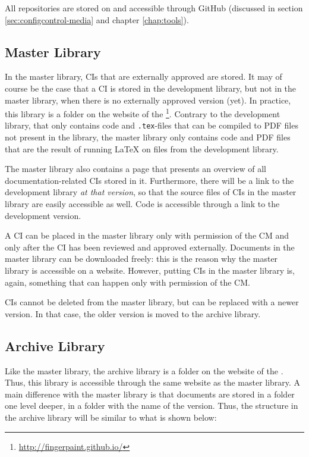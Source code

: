 All repositories are stored on and accessible through GitHub (discussed in section \ref{sec:configcontrol-media} and chapter \ref{chap:tools}).

\subsection{Master Library}
In the master library, CIs that are externally approved are stored. It may of course be the case that a CI is stored in the development library, but not in the master library, when there is no externally approved version (yet). In practice, this library is a folder on the website of the \applicationname{}\footnote{\url{http://fingerpaint.github.io/}}. Contrary to the development library, that only contains code and \texttt{.tex}-files that can be compiled to PDF files not present in the library, the master library only contains code and PDF files that are the result of running \LaTeX{} on files from the development library.

The master library also contains a page that presents an overview of all documentation-related CIs stored in it. Furthermore, there will be a link to the development library \emph{at that version}, so that the source files of CIs in the master library are easily accessible as well. Code is accessible through a link to the development version.

A CI can be placed in the master library only with permission of the CM and only after the CI has been reviewed and approved externally. Documents in the master library can be downloaded freely: this is the reason why the master library is accessible on a website. However, putting CIs in the master library is, again, something that can happen only with permission of the CM.

CIs cannot be deleted from the master library, but can be replaced with a newer version. In that case, the older version is moved to the archive library.

\subsection{Archive Library}
Like the master library, the archive library is a folder on the website of the \applicationname{}. Thus, this library is accessible through the same website as the master library. A main difference with the master library is that documents are stored in a folder one level deeper, in a folder with the name of the version. Thus, the structure in the archive library will be similar to what is shown below:

